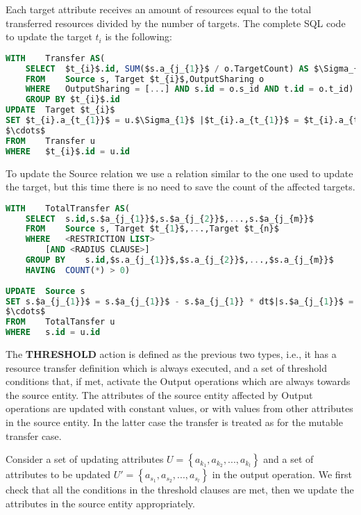 Each target attribute receives an amount of resources equal to the total transferred resources divided by the number of targets. The complete SQL code to update the target $t_{i}$ is the following:

\begin{lstlisting}[language=sql]
WITH	Transfer AS(
	SELECT	$t_{i}$.id, SUM($s.a_{j_{1}}$ / o.TargetCount) AS $\Sigma_{0}$,SUM($s.a_{j_{2}}$ / o.TargetCount) AS $\Sigma_{2}$,...,SUM($s.a_{j_{m}}$ / o.TargetCount) AS $\Sigma_{m}$
	FROM	Source s, Target $t_{i}$,OutputSharing o
	WHERE	OutputSharing = [...] AND s.id = o.s_id AND t.id = o.t_id)
	GROUP BY $t_{i}$.id
UPDATE	Target $t_{i}$
SET	$t_{i}.a_{t_{1}}$ = u.$\Sigma_{1}$ |$t_{i}.a_{t_{1}}$ = $t_{i}.a_{t_{1}}$ + u.$\Sigma_{1}$ * $dt$ |$t_{i}.a_{t_{1}}$ = $t_{i}.a_{t_{1}}$ - u.$\Sigma_{1}$ * $dt$
$\cdots$
FROM	Transfer u
WHERE	$t_{i}$.id = u.id
\end{lstlisting}

To update the Source relation we use a relation similar to the one used to update the target, but this time there is no need to save the count of the affected targets.

\begin{lstlisting}[language=sql]
WITH	TotalTransfer AS(
	SELECT	s.id,s.$a_{j_{1}}$,s.$a_{j_{2}}$,...,s.$a_{j_{m}}$
	FROM	Source s, Target $t_{1}$,...,Target $t_{n}$
	WHERE	<RESTRICTION LIST>
		[AND <RADIUS CLAUSE>]
	GROUP BY	s.id,$s.a_{j_{1}}$,$s.a_{j_{2}}$,...,$s.a_{j_{m}}$
	HAVING 	COUNT(*) > 0)
	
UPDATE	Source s
SET	s.$a_{j_{1}}$ = s.$a_{j_{1}}$ - s.$a_{j_{1}} * dt$|s.$a_{j_{1}}$ = s.$a_{j_{1}}$ + s.$a_{j_{1}} * dt $
$\cdots$
FROM	TotalTansfer u
WHERE	s.id = u.id
\end{lstlisting}

The \textbf{THRESHOLD} action is defined as the previous two types, i.e., it has a resource transfer definition which is always executed, and a set of threshold conditions that, if met, activate the Output operations which are always towards the source entity. The attributes of the source entity affected by Output operations are updated with constant values, or with values from other attributes in the source entity. In the latter case the transfer is treated as for the mutable transfer case.

Consider a set of updating attributes $U = \left\lbrace a_{k_{1}},a_{k_{2}},...,a_{k_{l}} \right\rbrace$ and a set of attributes to be updated $U'= \left\lbrace a_{s_{1}},a_{s_{2}},...,a_{s_{l}} \right\rbrace$ in the output operation. We first check that all the conditions in the threshold clauses are met, then we update the attributes in the source entity appropriately.

